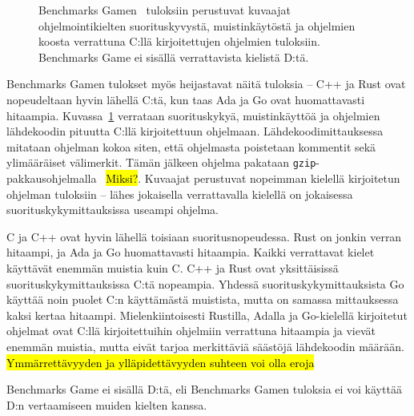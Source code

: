 \begin{figure}[ht!]
    \begin{adjustbox}{center}
    \begin{minipage}{1.15\textwidth}
    \begin{minipage}{0.5\textwidth}
        
        \vspace*{-0.8cm}
    \end{minipage}
    \begin{minipage}{0.5\textwidth}
        
        \vspace*{-0.9cm}
    \end{minipage}
    \end{minipage}
    \end{adjustbox}
    \begin{adjustbox}{center}
    \begin{minipage}{1.15\textwidth}
    \end{minipage}
    \end{adjustbox}
    \caption{
        Benchmarks Gamen~\citep[tiedot haettu 10.1.2019]{benchmarks} tuloksiin
        perustuvat kuvaajat ohjelmointikielten suorituskyvystä, muistinkäytöstä
        ja ohjelmien koosta verrattuna C:llä kirjoitettujen ohjelmien
        tuloksiin. Benchmarks Game ei sisällä verrattavista kielistä D:tä.}
    \label{fig:benchmarksgame}
\end{figure}

Benchmarks Gamen tulokset myös heijastavat näitä tuloksia -- C++ ja Rust ovat
nopeudeltaan hyvin lähellä C:tä, kun taas Ada ja Go ovat huomattavasti
hitaampia. Kuvassa~\ref{fig:benchmarksgame} verrataan suorituskykyä,
muistinkäyttöä ja ohjelmien lähdekoodin pituutta C:llä kirjoitettuun ohjelmaan.
Lähdekoodimittauksessa mitataan ohjelman kokoa siten, että ohjelmasta
poistetaan kommentit sekä ylimääräiset välimerkit. Tämän jälkeen ohjelma
pakataan \texttt{gzip}-pakkausohjelmalla~\citep{howmeasured} \hl{Miksi?}.
Kuvaajat perustuvat nopeimman kielellä kirjoitetun ohjelman tuloksiin -- lähes
jokaisella verrattavalla kielellä on jokaisessa suorituskykymittauksissa
useampi ohjelma.

C ja C++ ovat hyvin lähellä toisiaan suoritusnopeudessa. Rust on jonkin verran
hitaampi, ja Ada ja Go huomattavasti hitaampia. Kaikki verrattavat kielet
käyttävät enemmän muistia kuin C. C++ ja Rust ovat yksittäisissä
suorituskykymittauksissa C:tä nopeampia. Yhdessä suorituskykymittauksista Go
käyttää noin puolet C:n käyttämästä muistista, mutta on samassa mittauksessa
kaksi kertaa hitaampi. Mielenkiintoisesti Rustilla, Adalla ja Go-kielellä
kirjoitetut ohjelmat ovat C:llä kirjoitettuihin ohjelmiin verrattuna hitaampia
ja vievät enemmän muistia, mutta eivät tarjoa merkittäviä säästöjä lähdekoodin
määrään. \hl{Ymmärrettävyyden ja ylläpidettävyyden suhteen voi olla eroja}

Benchmarks Game ei sisällä D:tä, eli Benchmarks Gamen tuloksia ei voi käyttää
D:n vertaamiseen muiden kielten kanssa.

\FloatBarrier

\null

\newpage
